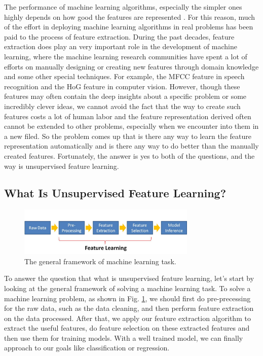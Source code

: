 \documentclass[conference]{IEEEtran}
\begin{document}
The performance of machine learning algorithms, especially the simpler ones  highly depends on how good the features are represented \cite{review}. For this reason, much of the effort in deploying machine learning algorithms in real problems has been paid to the process of feature extraction. During the past decades, feature extraction does play an very important role in the development of machine learning, where the machine learning research communities have spent a lot of efforts on manually designing or creating new features through domain knowledge and some other special techniques. For example, the MFCC feature in speech recognition and the HoG feature in computer vision. However, though these features may often contain the deep insights about a specific problem or some incredibly clever ideas, we cannot avoid the fact that the way to create such features costs a lot of human labor and the feature representation derived often cannot be extended to other problems, especially when we encounter into them in a new filed. So the problem comes up that is there any way to learn the feature representation automatically and is there any way to do better than the manually created features. Fortunately, the answer is yes to both of the questions, and the way is unsupervised feature learning.

\subsection{What Is Unsupervised Feature Learning?}

\begin{figure}[t]
\centering
\includegraphics[width=85mm]{feature_learning.pdf}
\caption{The general framework of machine learning task.}
\label{fig:ml_task}
\end{figure}

To answer the question that what is unsupervised feature learning, let's start by looking at the general framework of solving a machine learning task. To solve a machine learning problem, as shown in Fig. \ref{fig:ml_task}, we should first do pre-precessing for the raw data, such as the data cleaning, and then perform feature extraction on the data processed. After that, we apply our feature extraction algorithm to extract the useful features, do feature selection on these extracted features and then use them for training models. With a well trained model, we can finally approach to our goals like classification or regression.
\end{document}

